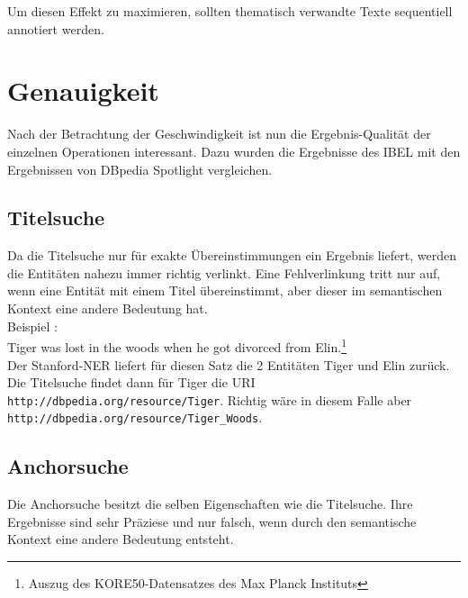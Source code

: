 \documentclass[11pt, a4paper, oneside]{Thesis} %
\begin{document}
Um diesen Effekt zu maximieren, sollten thematisch verwandte Texte sequentiell annotiert werden.


\section{Genauigkeit}
Nach der Betrachtung der Geschwindigkeit ist nun die Ergebnis-Qualit\"at der einzelnen Operationen interessant. Dazu wurden die Ergebnisse des IBEL mit den Ergebnissen von DBpedia Spotlight vergleichen.
\subsection{Titelsuche}
Da die Titelsuche nur f\"ur exakte \"Ubereinstimmungen ein Ergebnis liefert, werden die Entit\"aten nahezu immer richtig verlinkt. Eine Fehlverlinkung tritt nur auf, wenn eine Entit\"at mit einem Titel \"ubereinstimmt, aber dieser im semantischen Kontext eine andere Bedeutung hat.\\
Beispiel :\\
Tiger was lost in the woods when he got divorced from Elin.\footnote{Auszug des KORE50-Datensatzes des Max Planck Instituts} \\Der Stanford-NER liefert f\"ur diesen Satz die 2 Entit\"aten Tiger und Elin zur\"uck. Die Titelsuche findet dann f\"ur Tiger die URI \texttt{http://dbpedia.org/resource/Tiger}. Richtig w\"are in diesem Falle aber \texttt{http://dbpedia.org/resource/Tiger\_Woods}.

\subsection{Anchorsuche}
Die Anchorsuche besitzt die selben Eigenschaften wie die Titelsuche. Ihre Ergebnisse sind sehr Pr\"aziese und nur falsch, wenn durch den semantische Kontext eine andere Bedeutung entsteht.
\end{document}
